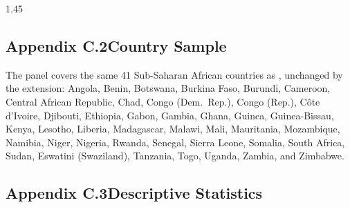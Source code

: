 \documentclass[12pt]{article}
\begin{document}
\begin{bibunit}[jpe]
\begin{spacing}{1.45}
\subsection*{Appendix C.2\quad Country Sample}

The panel covers the same 41 Sub-Saharan African countries as \citet{bruckner2011rain}, unchanged by the extension: Angola, Benin, Botswana, Burkina Faso, Burundi, Cameroon, Central African Republic, Chad, Congo (Dem.\ Rep.), Congo (Rep.), C\^ote d'Ivoire, Djibouti, Ethiopia, Gabon, Gambia, Ghana, Guinea, Guinea-Bissau, Kenya, Lesotho, Liberia, Madagascar, Malawi, Mali, Mauritania, Mozambique, Namibia, Niger, Nigeria, Rwanda, Senegal, Sierra Leone, Somalia, South Africa, Sudan, Eswatini (Swaziland), Tanzania, Togo, Uganda, Zambia, and Zimbabwe.

\subsection*{Appendix C.3\quad Descriptive Statistics}


\end{spacing}
\end{bibunit}
\end{document}
